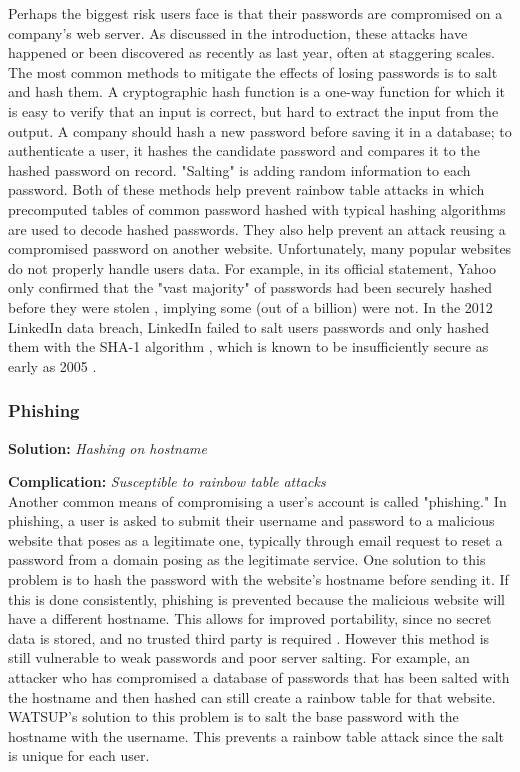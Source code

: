 Perhaps the biggest risk users face is that their passwords are compromised on a company's web server. As discussed in the introduction, these attacks have happened or been discovered as recently as last year, often at staggering scales. The most common methods to mitigate the effects of losing passwords is to salt and hash them. A cryptographic hash function is a one-way function for which it is easy to verify that an input is correct, but hard to extract the input from the output. A company should hash a new password before saving it in a database; to authenticate a user, it hashes the candidate password and compares it to the hashed password on record. "Salting" is adding random information to each password. Both of these methods help prevent rainbow table attacks in which precomputed tables of common password hashed with typical hashing algorithms are used to decode hashed passwords. They also help prevent an attack reusing a compromised password on another website. Unfortunately, many popular websites do not properly handle users data. For example, in its official statement, Yahoo only confirmed that the "vast majority" of passwords had been securely hashed before they were stolen \cite{Yahoo_Official:2016}, implying some (out of a billion) were not. In the 2012 LinkedIn data breach, LinkedIn failed to salt users passwords and only hashed them with the SHA-1 algorithm \cite{LinkedIn_NYTimes:2012, LinkedIn_Fortune:2016}, which is known to be insufficiently secure as early as 2005 \cite{wang:2005}.


\subsubsection{Phishing}

\textbf{Solution:} \emph{Hashing on hostname}

\noindent\textbf{Complication:} \emph{Susceptible to rainbow table attacks}\\

Another common means of compromising a user's account is called "phishing." In phishing, a user is asked to submit their username and password to a malicious website that poses as a legitimate one, typically through email request to reset a password from a domain posing as the legitimate service. One solution to this problem is to hash the password with the website's hostname before sending it. If this is done consistently, phishing is prevented because the malicious website will have a different hostname. This allows for improved portability, since no secret data is stored, and no trusted third party is required \cite{Halderman:2005}. However this method is still vulnerable to weak passwords and poor server salting. For example, an attacker who has compromised a database of passwords that has been salted with the hostname and then hashed can still create a rainbow table for that website. WATSUP's solution to this problem is to salt the base password with the hostname with the username. This prevents a rainbow table attack since the salt is unique for each user.


